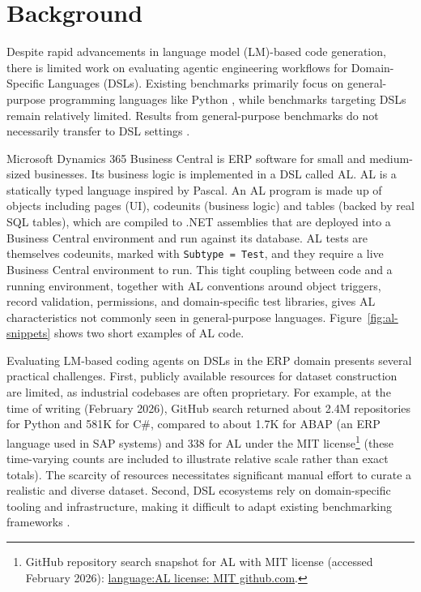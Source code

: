 \documentclass{article}
\begin{document}
\printAffiliationsAndNotice{\icmlEqualContribution} %
\clearpage

\section{Background}

Despite rapid advancements in language model (LM)-based code generation, there is limited work on evaluating agentic engineering workflows for Domain-Specific Languages (DSLs). Existing benchmarks primarily focus on general-purpose programming languages like Python \cite{jimenez_swe-bench_2024, deng_swe-bench_2025}, while benchmarks targeting DSLs remain relatively limited. Results from general-purpose benchmarks do not necessarily transfer to DSL settings \cite{cassano_knowledge_2024}.

Microsoft Dynamics 365 Business Central is ERP software for small and medium-sized businesses. Its business logic is implemented in a DSL called AL. AL is a statically typed language inspired by Pascal. An AL program is made up of objects including pages (UI), codeunits (business logic) and tables (backed by real SQL tables), which are compiled to .NET assemblies that are deployed into a Business Central environment and run against its database. AL tests are themselves codeunits, marked with \texttt{Subtype = Test}, and they require a live Business Central environment to run. This tight coupling between code and a running environment, together with AL conventions around object triggers, record validation, permissions, and domain-specific test libraries, gives AL characteristics not commonly seen in general-purpose languages. Figure~\ref{fig:al-snippets} shows two short examples of AL code.

Evaluating LM-based coding agents on DSLs in the ERP domain presents several practical challenges. First, publicly available resources for dataset construction are limited, as industrial codebases are often proprietary. For example, at the time of writing (February 2026), GitHub search returned about 2.4M repositories for Python and 581K for C\#, compared to about 1.7K for ABAP (an ERP language used in SAP systems) and 338 for AL under the MIT license\footnote{GitHub repository search snapshot for AL with MIT license (accessed February 2026): \href{https://github.com/search?q=language\%3AAL+license\%3AMIT\&type=repositories}{language:AL license: MIT github.com}.} (these time-varying counts are included to illustrate relative scale rather than exact totals). The scarcity of resources necessitates significant manual effort to curate a realistic and diverse dataset. Second, DSL ecosystems rely on domain-specific tooling and infrastructure, making it difficult to adapt existing benchmarking frameworks \cite{joel_survey_2025,yang_swe-bench_2024}.
\end{document}
